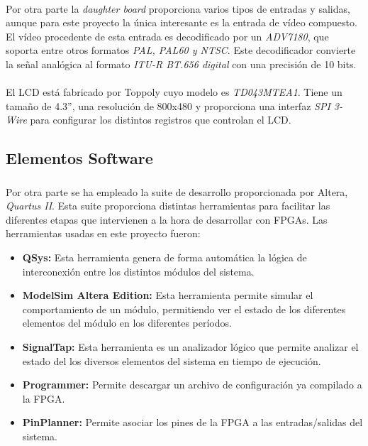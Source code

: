 \documentclass[a4paper,12pt,titlepage,final]{book}
\begin{document}
\paragraph{}
Por otra parte la \textit{daughter board} proporciona varios tipos de entradas y salidas, aunque para este proyecto la única interesante es la entrada de vídeo compuesto. El vídeo procedente de esta entrada es decodificado por un \textit{ADV7180}, que soporta entre otros formatos \textit{PAL, PAL60 y NTSC}. Este decodificador convierte  la señal analógica al formato \textit{ITU-R BT.656 digital} con una precisión de 10 bits.

\paragraph{}
El LCD está fabricado por Toppoly cuyo modelo es \textit{TD043MTEA1}. Tiene un tamaño de 4.3”, una resolución de 800x480 y proporciona una interfaz \textit{SPI 3-Wire} para configurar los distintos registros que controlan el LCD.

\subsection{Elementos Software}
\subsubsection*{}

\paragraph{}
Por otra parte se ha empleado la suite de desarrollo proporcionada por Altera, \textit{Quartus II}. Esta suite proporciona distintas herramientas para facilitar las diferentes etapas que intervienen a la hora de desarrollar con FPGAs. Las herramientas usadas en este proyecto fueron:

\begin{itemize}
\item \textbf{QSys:} Esta herramienta genera de forma automática la lógica de interconexión entre los distintos módulos del sistema.

\item \textbf{ModelSim Altera Edition:} Esta herramienta permite simular el comportamiento de un módulo, permitiendo ver el estado de los diferentes elementos del módulo en los diferentes períodos.

\item \textbf{SignalTap:} Esta herramienta es un analizador lógico que permite analizar el estado del los diversos elementos del sistema en tiempo de ejecución.

\item \textbf{Programmer:} Permite descargar un archivo de configuración ya compilado a la FPGA.

\item \textbf{PinPlanner:} Permite asociar los pines de la FPGA a las entradas/salidas del sistema.
\end{itemize}
\end{document}
